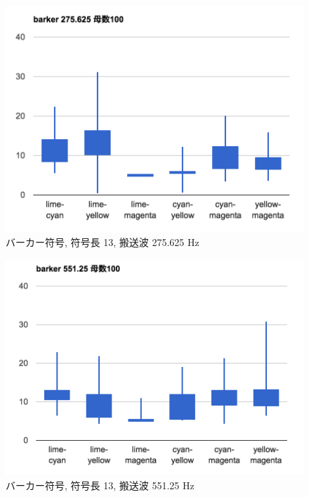 \begin{figure}[p]
  \centering
  \includegraphics[clip,width=1.05\hsize]{img/b275.png}
  \caption{バーカー符号, 符号長 13, 搬送波 275.625 Hz}\label{fig:b275}
\end{figure}

\begin{figure}[p]
  \centering
  \includegraphics[clip,width=1.05\hsize]{img/b551.png}
  \caption{バーカー符号, 符号長 13, 搬送波 551.25 Hz}\label{fig:b551}
\end{figure}



\clearpage



